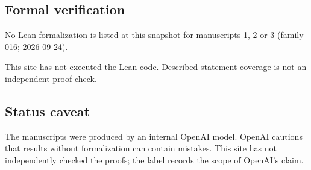\documentclass[11pt]{article}
\begin{document}
\subsection{Formal verification}
No Lean formalization is listed at this snapshot for manuscripts 1, 2 or 3 (family 016; 2026-09-24).

This site has not executed the Lean code. Described statement coverage is not an independent proof check.

\subsection{Status caveat}
The manuscripts were produced by an internal OpenAI model. OpenAI cautions that results without formalization can contain mistakes. This site has not independently checked the proofs; the label records the scope of OpenAI's claim.
\end{document}
